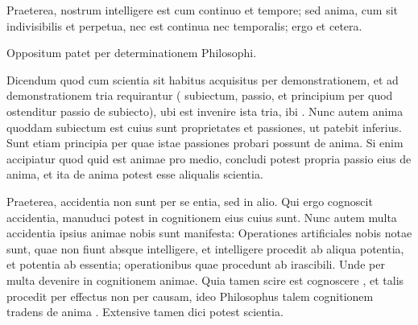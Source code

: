 %
Praeterea, nostrum intelligere est cum continuo et tempore; sed anima, cum sit indivisibilis et perpetua, nec est continua nec temporalis; ergo et cetera.

\medbreak

%
Oppositum patet per determinationem Philosophi.

\medbreak

%
Dicendum quod cum scientia sit habitus acquisitus per demonstrationem, et ad demonstrationem tria requirantur (  subiectum, passio, et principium per quod ostenditur passio de subiecto), ubi est invenire ista tria, ibi . Nunc autem anima quoddam subiectum est cuius sunt  proprietates et passiones, ut patebit inferius. Sunt etiam principia per quae istae passiones probari possunt de anima. Si enim accipiatur quod quid est animae pro medio,  concludi potest propria passio eius de anima, et ita de anima potest  esse aliqualis scientia.

%
Praeterea, accidentia non sunt per se entia, sed in alio. Qui ergo cognoscit accidentia, manuduci potest in cognitionem eius cuius sunt. Nunc autem multa accidentia ipsius animae nobis sunt manifesta: Operationes  artificiales nobis notae sunt, quae  non fiunt absque intelligere, et intelligere procedit ab aliqua potentia, et potentia  ab essentia;  operationibus quae procedunt ab irascibili. Unde per multa  devenire  in cognitionem animae. Quia tamen scire est  cognoscere , et talis  procedit per effectus  non per causam, ideo Philosophus talem cognitionem tradens de anima  . Extensive tamen dici potest scientia.

